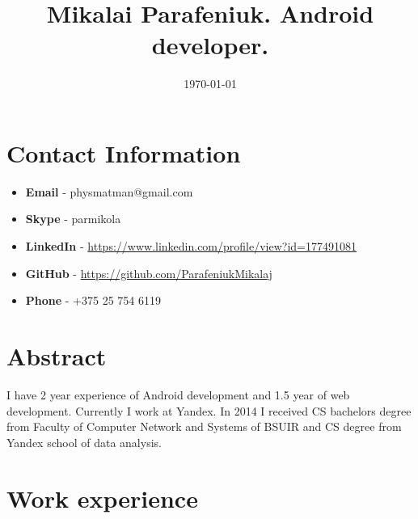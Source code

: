 \documentclass{article}
\title{Mikalai Parafeniuk. Android developer.}
\date{\today}
\begin{document}
\maketitle

\section*{Contact Information}
\begin{itemize}
\item \textbf{Email} - physmatman@gmail.com
\item \textbf{Skype} - parmikola
\item \textbf{LinkedIn} - \url{https://www.linkedin.com/profile/view?id=177491081}
\item \textbf{GitHub} - \url{https://github.com/ParafeniukMikalaj}
\item \textbf{Phone} - +375 25 754 6119
\end{itemize}

\section*{Abstract}
I have 2 year experience of Android development and 1.5 year of web development. Currently I work at Yandex. In 2014 I received CS bachelors degree from Faculty of Computer Network and Systems of BSUIR and CS degree from Yandex school of data analysis.

\section*{Work experience}
\end{document}
